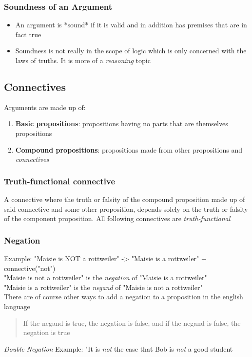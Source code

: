 \documentclass[]{article}
\begin{document}
\subsubsection{Soundness of an Argument}
\begin{itemize}
	\item{An argument is *sound* if it is valid and in addition has premises that are in fact true}
	\item{Soundness is not really in the scope of logic which is only concerned with the laws of truths. It is more of a \textit{reasoning} topic}
\end{itemize}
\subsection{Connectives}
Arguments are made up of:
\begin{enumerate}
	\item{\textbf{Basic propositions}: propositions having no parts that are themselves propositions }
	\item{\textbf{Compound propositions}: propositions made from other propositions and \textit{connectives}}
\end{enumerate}
\subsubsection{Truth-functional connective}
A connective where the truth or falsity of the compound proposition made up of said connective and some other proposition, depends solely on the truth or falsity of the component proposition. All following connectives are \textit{truth-functional}
\subsubsection{Negation}
Example: "Maisie is NOT a rottweiler" -> "Maisie is a rottweiler" + connective("not")\\
"Maisie is not a rottweiler" is the \textit{negation} of "Maisie is a rottweiler"\\
"Maisie is a rottweiler" is the \textit{negand} of "Maisie is not a rottweiler"\vspace{5pt}\\
There are of course other ways to add a negation to a proposition in the english language
\begin{quote}
	If the negand is true, the negation is false, and if the negand is false, the negation is true
\end{quote}
\textit{Double Negation} Example: "It is \textit{not} the case that Bob is \textit{not} a good student 
\end{document}
